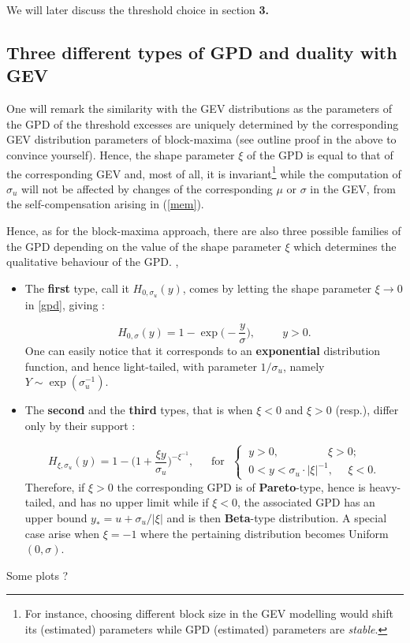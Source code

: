 We will later discuss the threshold choice in section \textbf{3.}


\subsection{Three different types of GPD and duality with GEV} One will remark the similarity with the GEV distributions as the parameters of the GPD of the threshold excesses are uniquely determined by the corresponding GEV distribution parameters of block-maxima (see outline proof in the above to convince yourself). Hence, the shape parameter $\xi$ of the GPD is equal to that of the corresponding GEV and, most of all, it is invariant\footnote{For instance, choosing different block size in the GEV modelling would shift its (estimated) parameters while GPD  (estimated) parameters are \emph{stable}. } while the computation of $\sigma_u$ will not be affected by changes of the corresponding $\mu$ or $\sigma$ in the GEV, from the self-compensation arising in (\ref{mem}). \cite[pp.76]{coles_introduction_2001}

Hence, as for the block-maxima approach, there are also three possible families of the GPD depending on the value of the shape parameter $\xi$ which determines the qualitative behaviour of the GPD. \cite{hosking_parameter_1987}, \cite{singh_parameter_1995}

\begin{itemize}
	\item The \textbf{first} type, call it $H_{0,\sigma_u}(y)$, comes by letting the shape parameter $\xi\rightarrow 0$ in \ref{gpd}, giving :
	
	\begin{equation}\label{gpd0}
	H_{0,\sigma}(y)=1-\exp
	\Big(-\frac{y}{\sigma}\Big), \ \ \ \ \ \ \ \ \ \ \ y>0.
	\end{equation}
	One can easily notice that it corresponds to an \textbf{exponential} distribution 
	function, and hence light-tailed, with parameter $1/ \sigma_u$, namely 
	$Y\sim\exp(\sigma_u^{-1})$.
	
	\item The \textbf{second} and the \textbf{third} types, that is when $\xi<0$ and $\xi>0$ (resp.), differ only by their support : 
	
	\begin{equation}\label{gpdm}
	H_{\xi,\sigma_u}(y)=1-\bigg(1+\frac{\xi y}{\sigma_u}\bigg)^{-\xi^{-1}}, \ \ \ \ \  \ \ \text{for} \ \ \ \begin{cases}
	\ y>0,  \ \ \ \ \ \ \ \ \ \ \ \ \ \ \ \  \ \ \ \ \xi>0; \\
	\  0<y<\sigma_u\cdot|\xi|^{-1}, \ \ \ \  \  \  \xi<0.
	\end{cases}
	\end{equation}
	Therefore, if $\xi>0$ the corresponding GPD is of \textbf{Pareto}-type, hence is heavy-tailed, and has no upper limit while if $\xi<0$, the associated GPD has an upper bound $y_*=u+\sigma_u/|\xi|$ and is then \textbf{Beta}-type distribution. A special case arise when $\xi=-1$ where the pertaining distribution becomes Uniform$(0,\sigma)$. \cite[pp.186]{grimshaw_computing_1993}
	
	
\end{itemize}
Some plots ? 


